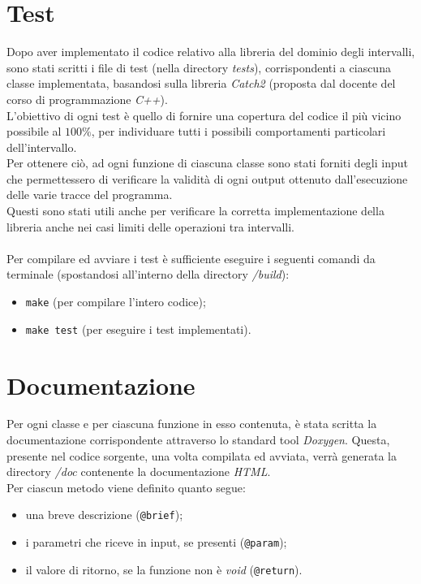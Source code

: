 \documentclass[a4paper, 10pt]{report}
\begin{document}
\section*{Test}
Dopo aver implementato il codice relativo alla libreria del dominio degli intervalli, sono stati scritti i file di test (nella directory \textit{tests}), corrispondenti a ciascuna classe implementata, basandosi sulla libreria \textit{Catch2} (proposta dal docente del corso di programmazione \textit{C++}).\\
L'obiettivo di ogni test è quello di fornire una copertura del codice il più vicino possibile al $100\%$, per individuare tutti i possibili comportamenti particolari dell'intervallo.\\
Per ottenere ciò, ad ogni funzione di ciascuna classe sono stati forniti degli input che permettessero di verificare la validità di ogni output ottenuto dall'esecuzione delle varie tracce del programma.\\
Questi sono stati utili anche per verificare la corretta implementazione della libreria anche nei casi limiti delle operazioni tra intervalli.\\
\\
Per compilare ed avviare i test è sufficiente eseguire i seguenti comandi da terminale (spostandosi all'interno della directory \textit{/build}):
\begin{itemize}
	\item \verb|make| (per compilare l'intero codice);
	\item \verb|make test| (per eseguire i test implementati).
\end{itemize}


\section*{Documentazione}
Per ogni classe e per ciascuna funzione in esso contenuta, è stata scritta la documentazione corrispondente attraverso lo standard tool \textit{Doxygen}. Questa, presente nel codice sorgente, una volta compilata ed avviata, verrà generata la directory \textit{/doc} contenente la documentazione \textit{HTML}.\\
Per ciascun metodo viene definito quanto segue:
\begin{itemize}
	\item una breve descrizione (\verb|@brief|);
	\item i parametri che riceve in input, se presenti (\verb|@param|);
	\item il valore di ritorno, se la funzione non è \textit{void} (\verb|@return|).
\end{itemize}
\end{document}
